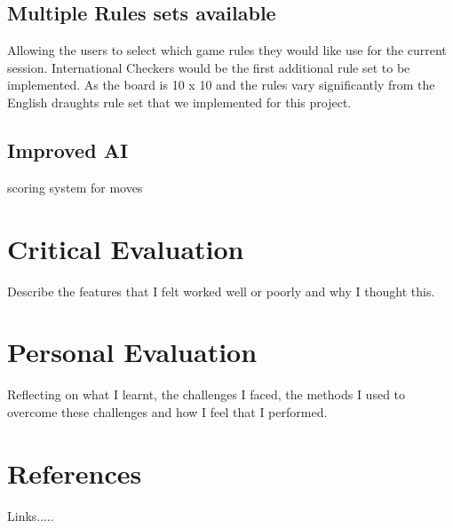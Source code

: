 \documentclass[10pt, a4paper]{article}
\begin{document}
    
    \subsection{Multiple Rules sets available}
    Allowing the users to select which game rules they would like use for the current session. International Checkers would be the first additional rule set to be implemented. As the board is 10 x 10 and the rules vary significantly from the English draughts rule set that we implemented for this project.
    
    
    \subsection{Improved AI}
    scoring system for moves
    
    
    
    \section{Critical Evaluation}
    Describe the features that I felt worked well or poorly and why I thought this.
    
    \section{Personal Evaluation}
   Reflecting on what I learnt, the challenges I faced, the methods I used to overcome these challenges and how I feel that I performed.
   
   \section{References}
   Links.....
   
   
\end{document}
